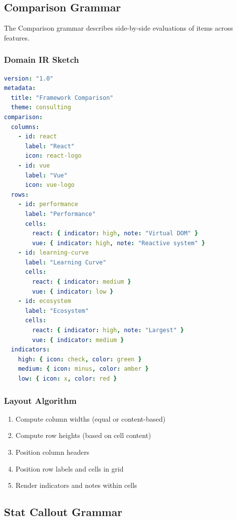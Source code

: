 \subsection{Comparison Grammar}
\label{sec:comparison-grammar}

The Comparison grammar describes side-by-side evaluations of items across features.

\subsubsection{Domain IR Sketch}

\begin{lstlisting}[language=yaml,caption={Comparison Domain IR (sketch)}]
version: "1.0"
metadata:
  title: "Framework Comparison"
  theme: consulting
comparison:
  columns:
    - id: react
      label: "React"
      icon: react-logo
    - id: vue
      label: "Vue"
      icon: vue-logo
  rows:
    - id: performance
      label: "Performance"
      cells:
        react: { indicator: high, note: "Virtual DOM" }
        vue: { indicator: high, note: "Reactive system" }
    - id: learning-curve
      label: "Learning Curve"
      cells:
        react: { indicator: medium }
        vue: { indicator: low }
    - id: ecosystem
      label: "Ecosystem"
      cells:
        react: { indicator: high, note: "Largest" }
        vue: { indicator: medium }
  indicators:
    high: { icon: check, color: green }
    medium: { icon: minus, color: amber }
    low: { icon: x, color: red }
\end{lstlisting}

\subsubsection{Layout Algorithm}

\begin{enumerate}
  \item Compute column widths (equal or content-based)
  \item Compute row heights (based on cell content)
  \item Position column headers
  \item Position row labels and cells in grid
  \item Render indicators and notes within cells
\end{enumerate}

\subsection{Stat Callout Grammar}
\label{sec:stat-grammar}

